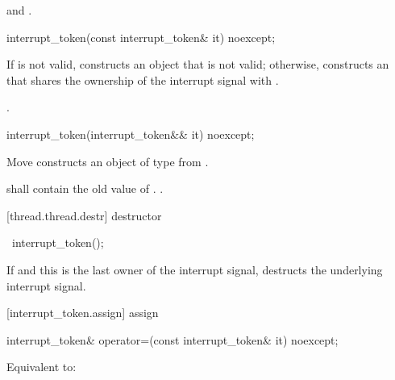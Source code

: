{\begin{itemdescr}
  \pnum\postconditions {} and .
\end{itemdescr}

%
\begin{itemdecl}
interrupt_token(const interrupt_token& it) noexcept;
\end{itemdecl}
\begin{itemdescr}
  \pnum\effects If  is not valid, constructs an  object
                that is not valid;
                otherwise, constructs an 
                that shares the ownership of the interrupt signal with .

  \pnum\postconditions {}.
\end{itemdescr}

%
\begin{itemdecl}
interrupt_token(interrupt_token&& it) noexcept;
\end{itemdecl}
\begin{itemdescr}
  \pnum\effects Move constructs an object of type  from .

  \pnum\postconditions {} shall contain the old value of .
                        .
\end{itemdescr}

[thread.thread.destr]{ destructor}

%
\begin{itemdecl}
~interrupt_token();
\end{itemdecl}

\begin{itemdescr}
 \pnum\effects If  and this is the last owner of the interrupt signal,
                destructs the underlying interrupt signal.
\end{itemdescr}

[interrupt_token.assign]{ assign}

%
\begin{itemdecl}
interrupt_token& operator=(const interrupt_token& it) noexcept;
\end{itemdecl}
\begin{itemdescr}
  \pnum\effects Equivalent to: 


\end{itemdescr}}
